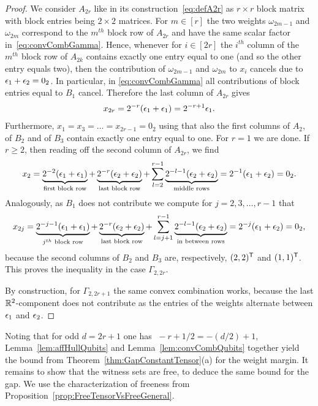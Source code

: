 \begin{proof}
	We consider $A_{2r}$ like in its construction~\eqref{eq:defA2r} as $r \times r$ block matrix with block entries being $2 \times 2$ matrices. For $m \in [r]$ the two weights $\omega_{2m-1}$ and $\omega_{2m}$ correspond to the $m^{th}$ block row of $A_{2r}$ and have the same scalar factor in~\eqref{eq:convCombGamma}. Hence, whenever for $i \in [2r]$ the $i^{th}$ column of the $m^{th}$ block row of $A_{2k}$ contains exactly one entry equal to one (and so the other entry equals two), then the contribution of $\omega_{2m-1}$ and $\omega_{2m}$ to $x_i$ cancels due to $\epsilon_1 + \epsilon_2 = 0_2$.
	In particular, in \eqref{eq:convCombGamma} all contributions of block entries equal to $B_1$ cancel. Therefore the last column of $A_{2r}$ gives
	\begin{align*}
		x_{2r} = 2^{-r} (\epsilon_1 + \epsilon_1) = 2^{-r+1} \epsilon_1.
	\end{align*}
	Furthermore, $x_1 = x_{3} = \ldots = x_{2r-1} = 0_2$ using that also the first columns of $A_2$, of $B_2$ and of $B_3$ contain exactly one entry equal to one. For $r=1$ we are done.
	If $r \geq 2$, then reading off the second column of $A_{2r}$, we find 
	\begin{align*}
		x_2 = \underbrace{2^{-2} (\epsilon_1 + \epsilon_1)}_{\text{first block row}} + \underbrace{2^{-r} (\epsilon_2 + \epsilon_2)}_{\text{last block row}} + \sum_{l=2}^{r-1} \underbrace{ 2^{-l-1} (\epsilon_2 + \epsilon_2)}_{\text{middle rows}} = 2^{-1} (\epsilon_1 + \epsilon_2) = 0_2.
	\end{align*}
	Analogously, as $B_1$ does not contribute we compute for $j = 2,3,\ldots,r-1$ that
	\begin{align*}
		x_{2j} = \underbrace{2^{-j-1} (\epsilon_1 + \epsilon_1)}_{j^{th} \text{ block row}} + \underbrace{2^{-r} (\epsilon_2 + \epsilon_2)}_{\text{last block row}} + \sum_{l=j+1}^{r-1} \underbrace{ 2^{-l-1} (\epsilon_2 + \epsilon_2)}_{\text{in between rows}} = 2^{-j} (\epsilon_1 + \epsilon_2) = 0_2,
	\end{align*}
	because the second columns of $B_2$ and $B_3$ are, respectively, $(2,2)^{\mathsf{T}}$ and $(1,1)^{\mathsf{T}}$. This proves the inequality in the case $\Gamma_{2,2r}$.
	
	By construction, for $\Gamma_{2,2r+1}$ the same convex combination works, because the last $\mathbb R^2$-component does not contribute as the entries of the weights alternate between $\epsilon_1$ and $\epsilon_2$.
\end{proof}

Noting that for odd $d=2r+1$ one has $\; -r + 1/2 = -(d/2) + 1$, Lemma~\ref{lem:affHullQubits} and Lemma~\ref{lem:convCombQubits} together yield the bound from Theorem~\ref{thm:GapConstantTensor}(a) for the weight margin.
It remains to show that the witness sets are free, to deduce the same bound for the gap. We use the characterization of freeness from Proposition~\ref{prop:FreeTensorVsFreeGeneral}.

